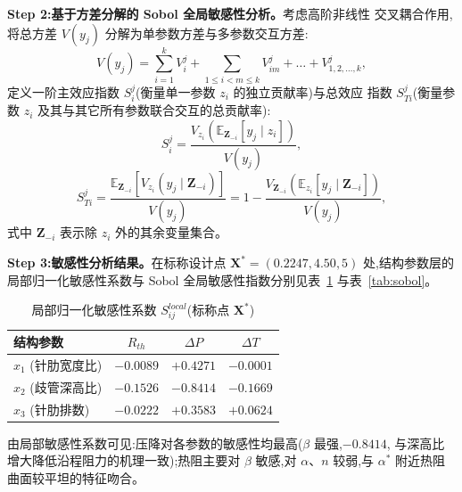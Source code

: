 \textbf{Step 2:基于方差分解的 Sobol 全局敏感性分析。}考虑高阶非线性
交叉耦合作用,将总方差 $V(y_j)$ 分解为单参数方差与多参数交互方差:
\begin{equation}
  V(y_j) = \sum_{i=1}^{k} V_i^j + \sum_{1 \le i < m \le k} V_{im}^j
  + \dots + V_{1,2,\dots,k}^j,
  \label{eq:sobol-decomp}
\end{equation}
定义一阶主效应指数 $S_i^j$(衡量单一参数 $z_i$ 的独立贡献率)与总效应
指数 $S_{Ti}^j$(衡量参数 $z_i$ 及其与其它所有参数联合交互的总贡献率):
\begin{equation}
  S_i^j = \frac{V_{z_i}\left( \mathbb{E}_{\mathbf{Z}_{-i}}[y_j \mid z_i]
    \right)}{V(y_j)},
  \label{eq:sobol-first}
\end{equation}
\begin{equation}
  S_{Ti}^j = \frac{\mathbb{E}_{\mathbf{Z}_{-i}}\left[ V_{z_i}(y_j \mid
    \mathbf{Z}_{-i}) \right]}{V(y_j)} = 1 -
  \frac{V_{\mathbf{Z}_{-i}}\left( \mathbb{E}_{z_i}[y_j \mid
      \mathbf{Z}_{-i}] \right)}{V(y_j)},
  \label{eq:sobol-total}
\end{equation}
式中 $\mathbf{Z}_{-i}$ 表示除 $z_i$ 外的其余变量集合。

\textbf{Step 3:敏感性分析结果。}在标称设计点
$\mathbf{X}^*=(0.2247,4.50,5)$ 处,结构参数层的局部归一化敏感性系数与
Sobol 全局敏感性指数分别见表~\ref{tab:lsa} 与表~\ref{tab:sobol}。

\begin{table}[htbp]
  \centering
  \caption{局部归一化敏感性系数 $S_{ij}^{local}$(标称点 $\mathbf{X}^*$)}
  \label{tab:lsa}
  \begin{tabular}{lccc}
    \toprule
    结构参数          & $R_{th}$  & $\Delta P$ & $\Delta T$ \\
    \midrule
    $x_1$ (针肋宽度比) & $-0.0089$ & $+0.4271$  & $-0.0001$  \\
    $x_2$ (歧管深高比) & $-0.1526$ & $-0.8414$  & $-0.1669$  \\
    $x_3$ (针肋排数)  & $-0.0222$ & $+0.3583$  & $+0.0624$  \\
    \bottomrule
  \end{tabular}
\end{table}

由局部敏感性系数可见:压降对各参数的敏感性均最高($\beta$ 最强,$-0.8414$,
与深高比增大降低沿程阻力的机理一致);热阻主要对 $\beta$ 敏感,对
$\alpha$、$n$ 较弱,与 $\alpha^*$ 附近热阻曲面较平坦的特征吻合。

